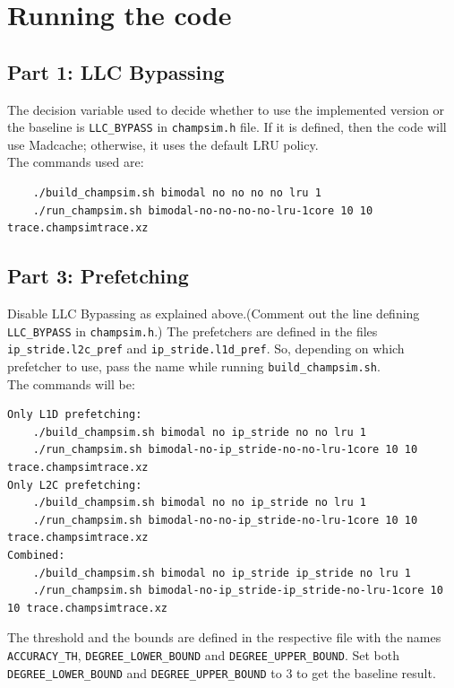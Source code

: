\documentclass[11pt, swedish, openany]{book}
\begin{document}
\chapter{Running the code}
\section{Part 1: LLC Bypassing}
The decision variable used to decide whether to use the implemented version or the baseline is \texttt{LLC\_BYPASS} in \texttt{champsim.h} file. If it is defined, then the code will use Madcache; otherwise, it uses the default LRU policy.\\
The commands used are:
\begin{verbatim}
    ./build_champsim.sh bimodal no no no no lru 1
    ./run_champsim.sh bimodal-no-no-no-no-lru-1core 10 10 trace.champsimtrace.xz
\end{verbatim}
\section{Part 3: Prefetching}
Disable LLC Bypassing as explained above.(Comment out the line defining \texttt{LLC\_BYPASS} in \texttt{champsim.h}.) The prefetchers are defined in the files \texttt{ip\_stride.l2c\_pref} and \texttt{ip\_stride.l1d\_pref}. So, depending on which prefetcher to use, pass the name while running \texttt{build\_champsim.sh}.\\
The commands will be:
\begin{verbatim}
Only L1D prefetching:
    ./build_champsim.sh bimodal no ip_stride no no lru 1
    ./run_champsim.sh bimodal-no-ip_stride-no-no-lru-1core 10 10 trace.champsimtrace.xz
Only L2C prefetching:
    ./build_champsim.sh bimodal no no ip_stride no lru 1
    ./run_champsim.sh bimodal-no-no-ip_stride-no-lru-1core 10 10 trace.champsimtrace.xz
Combined:
    ./build_champsim.sh bimodal no ip_stride ip_stride no lru 1
    ./run_champsim.sh bimodal-no-ip_stride-ip_stride-no-lru-1core 10 10 trace.champsimtrace.xz
\end{verbatim}
The threshold and the bounds are defined in the respective file with the names \texttt{ACCURACY\_TH}, \texttt{DEGREE\_LOWER\_BOUND} and \texttt{DEGREE\_UPPER\_BOUND}. Set both \texttt{DEGREE\_LOWER\_BOUND} and \texttt{DEGREE\_UPPER\_BOUND} to $3$ to get the baseline result.



\end{document}
